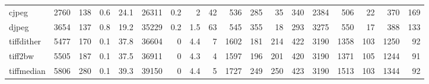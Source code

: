 \begin{tabular}{lrrrrrrrrrrrrrrrrr}
 cjpeg           &     2760 &  138 &    0.6 &     24.1 &   26311 &    0.2 &      2   &    42 &     536 &  285 &    35 &   340 &  2384 &   506 &     22 &       370 &     169 \\
 djpeg           &     3654 &  137 &    0.8 &     19.2 &   35229 &    0.2 &      1.5 &    63 &     545 &  355 &    18 &   293 &  3275 &   550 &     17 &       388 &     133 \\
 tiffdither      &     5477 &  170 &    0.1 &     37.8 &   36604 &    0   &      4.4 &     7 &    1602 &  181 &   214 &   422 &  3190 &  1358 &    103 &      1250 &      92 \\
 tiff2bw         &     5505 &  187 &    0.1 &     37.5 &   36911 &    0   &      4.3 &     4 &    1597 &  196 &   201 &   420 &  3190 &  1371 &    105 &      1244 &      91 \\
 tiffmedian      &     5806 &  280 &    0.1 &     39.3 &   39150 &    0   &      4.4 &     5 &    1727 &  249 &   250 &   423 &  3190 &  1513 &    103 &      1344 &      92 \\
\hline
\end{tabular}